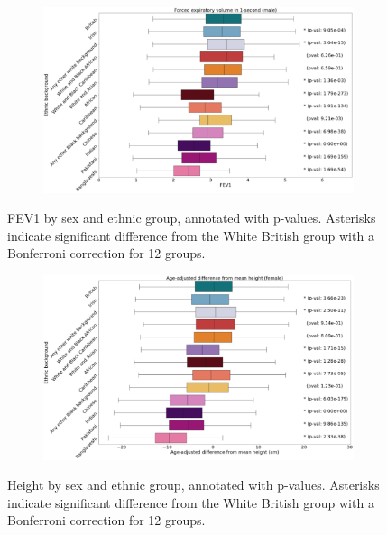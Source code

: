 \documentclass[12pt]{pnas-new}
\begin{document}
\begin{figure}
    \centering
    \begin{subfigure}{\textwidth}
    \includegraphics[width=\textwidth]{images/male_fev_boxplot_annotated.pdf}
    \end{subfigure}
    \caption{FEV1 by sex and ethnic group, annotated with p-values. Asterisks indicate significant difference from the White British group with a Bonferroni correction for 12 groups.}
    \label{fig:supp_box_fev_m}
\end{figure}

\begin{figure}
    \centering
    \begin{subfigure}{\textwidth}
    \includegraphics[width=\textwidth]{images/female_height_boxplot_annotated.pdf}
    \end{subfigure}
    \caption{Height by sex and ethnic group, annotated with p-values. Asterisks indicate significant difference from the White British group with a Bonferroni correction for 12 groups.}
    \label{fig:supp_box_height_f}
\end{figure}
\end{document}
